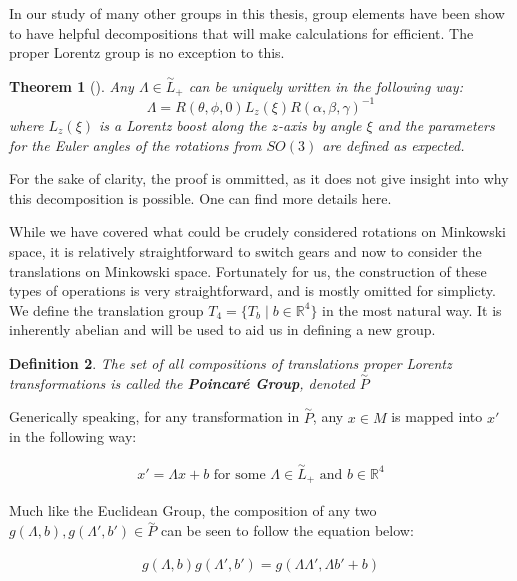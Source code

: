 \documentclass[10pt]{ucthesis}
\newcommand{\R}{\mathbb{R}}
\newtheorem{definition}{Definition}[chapter]
\newtheorem{theorem}[definition]{Theorem}
\begin{document}
In our study of many other groups in this thesis, group elements have been show to have helpful decompositions that will make calculations for efficient. The proper Lorentz group is no exception to this.

\begin{theorem}[\cite{Tung}]
	Any $\Lambda \in \overset{\sim}{L}_+$ can be uniquely written in the following way:
$$\Lambda = R(\theta,\phi,0)L_z(\xi)R(\alpha,\beta,\gamma)^{-1}$$
where $L_z(\xi)$ is a Lorentz boost along the $z$-axis by angle $\xi$ and the parameters for the Euler angles of the rotations from $SO(3)$ are defined as expected.
\end{theorem}

For the sake of clarity, the proof is ommitted, as it does not give insight into why this decomposition is possible. One can find more details here.\cite{Tung}

While we have covered what could be crudely considered rotations on Minkowski space, it is relatively straightforward to switch gears and now to consider the translations on Minkowski space. Fortunately for us, the construction of these types of operations is very straightforward, and is mostly omitted for simplicty. We define the translation group $T_4 = \{T_b \mid b\in\R^4\}$ in the most natural way. It is inherently abelian and will be used to aid us in defining a new group.

\begin{definition}
	The set of all compositions of translations proper Lorentz transformations is called the \textbf{Poincar\'e Group}, denoted $\overset{\sim}{P}$
\end{definition}

Generically speaking, for any transformation in $\overset{\sim}{P}$, any $x\in M$ is mapped into $x'$ in the following way:

\begin{equation}
\begin{aligned}
	x' = \Lambda x + b \text{ for some }\Lambda\in\overset{\sim}{L}_+ \text{ and } b\in\R^4
\end{aligned}
\end{equation}

Much like the Euclidean Group, the composition of any two $g(\Lambda,b),g(\Lambda',b')\in\overset{\sim}{P} $  can be seen to follow the equation below:

\begin{equation}
\begin{aligned}
g(\Lambda,b)g(\Lambda',b') = g(\Lambda\Lambda', \Lambda b' + b)
\end{aligned}
\end{equation}
\end{document}
